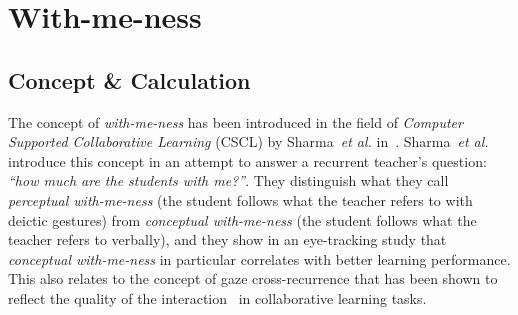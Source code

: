\documentclass{sig-alternate}
\newcommand{\etal}{\textit{et al.}\xspace}
\begin{document}
%
%
%
%
%




\section{With-me-ness}

\subsection{Concept \& Calculation}

The concept of \emph{with-me-ness} has been introduced in the field of
\emph{Computer Supported Collaborative Learning} (CSCL) by Sharma~\etal
in~\cite{sharma2014me}. Sharma~\etal introduce this concept in an attempt to
answer a recurrent teacher's question: {\it ``how much are the students with
me?''}. They distinguish what they call \emph{perceptual with-me-ness} (the
student follows what the teacher refers to with deictic gestures) from
\emph{conceptual with-me-ness} (the student follows what the teacher refers to
verbally), and they show in an eye-tracking study that \emph{conceptual
with-me-ness} in particular correlates with better learning performance. This
also relates to the concept of gaze cross-recurrence that has been shown to
reflect the quality of the interaction~\cite{jermann2012effects} in
collaborative learning tasks.
\end{document}
